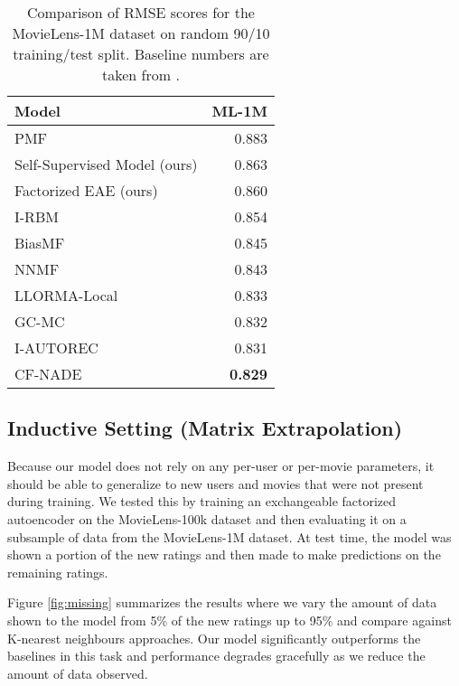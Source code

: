 \documentclass{article}
\newcommand{\tablefont}{\fontfamily{cmss}\fontseries{uc}\fontsize{10pt}{9pt}\selectfont\centering}
\theoremstyle{definition}
\begin{document}
\begin{table}[h]
\tablefont
\begin{tabular}{l r} 
  \toprule
  \textbf{Model} & \textbf{ML-1M}  \\ [0.5ex] 
  \midrule
  PMF {\smaller{\citep{mnih2008probabilistic}}} & 0.883  \\
  Self-Supervised Model (ours)& 0.863 \\
  Factorized EAE (ours)& 0.860\\
  I-RBM {\smaller{\citep{salakhutdinov2007restricted}}}  & 0.854 \\
  BiasMF {\smaller{\citep{koren2009matrix}}}  & 0.845 \\
  NNMF {\smaller{\citep{dziugaite2015neural}}} & 0.843 \\
  LLORMA-Local {\smaller{\citep{lee2013local}}} & 0.833 \\
  GC-MC {\smaller{\citep{berg2017graph}}} & 0.832\\
  I-AUTOREC {\smaller{\citep{sedhain2015autorec}}} & 0.831 \\
  CF-NADE {\smaller{\citep{zheng2016neural}}} & \textbf{0.829} \\
  \bottomrule
\end{tabular}
\caption {Comparison of RMSE scores for the MovieLens-1M dataset on random 90/10 training/test split. Baseline numbers are taken from \citep{berg2017graph}.}\label{results:perf1M}
\end{table}

\subsection{Inductive Setting (Matrix Extrapolation)}\label{sec:results_inductive}
Because our model does not rely on any per-user or per-movie parameters, it should be able to generalize to new users and movies that were not present during training. We tested this by training an exchangeable factorized autoencoder on the MovieLens-100k dataset and then evaluating it on a subsample of data from the MovieLens-1M dataset. At test time, the model was shown a portion of the new ratings and then made to make predictions on the remaining ratings. 

Figure \ref{fig:missing} summarizes the results where we vary the amount of data shown to the model from 5\% of the new ratings up to 95\% and compare against K-nearest neighbours approaches. Our model significantly outperforms the baselines in this task and performance degrades gracefully as we reduce the amount of data observed.
\end{document}
